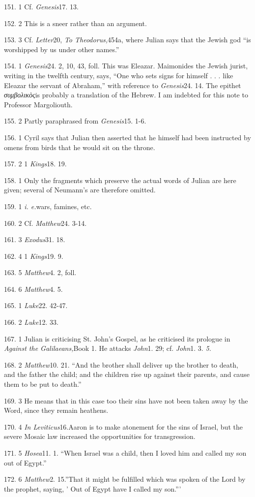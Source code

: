 151. 1 Cf. \emph{Genesis}17. 13.

152. 2 This is a sneer rather than an argument.

153. 3 Cf. \emph{Letter}20, \emph{To Theodorus,}454a, where Julian says that the Jewish god ``is worshipped by us under other names.''

154. 1 \emph{Genesis}24. 2, 10, 43, foll. This was Eleazar. Maimonides the Jewish jurist, writing in the twelfth century, says, ``One who sets signs for himself . . . like Eleazar the servant of Abraham,'' with reference to \emph{Genesis}24. 14. The epithet
\emph{συμβολικὸς}is probably a translation of the Hebrew. I am indebted for this note to Professor Margoliouth.

155. 2 Partly paraphrased from \emph{Genesis}15. 1-6.

156. 1 Cyril says that Julian then asserted that he himself had been instructed by omens from birds that he would sit on the throne.

157. 2 1 \emph{Kings}18. 19.

158. 1 Only the fragments which preserve the actual words of Julian are here given; several of Neumann's are therefore omitted.

159. 1 \emph{i. e.}wars, famines, etc.

160. 2 Cf. \emph{Matthew}24. 3-14.

161. 3 \emph{Exodus}31. 18.

162. 4 1 \emph{Kings}19. 9.

163. 5 \emph{Matthew}4. 2, foll.

164. 6 \emph{Matthew}4. 5.

165. 1 \emph{Luke}22. 42-47.

166. 2 \emph{Luke}12. 33.

167. 1 Julian is criticising St. John's Gospel, as he criticised its prologue in \emph{Against the Galilaeans,}Book 1. He attacks \emph{John}1. 29; cf. \emph{John}1. 3. \emph{5.}

168. 2 \emph{Matthew}10. 21. ``And the brother shall deliver up the
brother to death, and the father the child; and the children rise up against their parents, and cause them to be put to death.''

169. 3 He means that in this case too their sins have not been taken away by the Word, since they remain heathens.

170. 4 \emph{In Leviticus}16.\emph{}Aaron is to make atonement for the sins of Israel, but the severe Mosaic law increased the opportunities for transgression.

171. 5 \emph{Hosea}11. 1. ``When Israel was a child, then I loved him and called my son out of Egypt.''

172. 6 \emph{Matthew}2. 15.\emph{}''That it might be fulfilled which was spoken of the Lord by the prophet, saying, ' Out of Egypt have I called my son.'''
